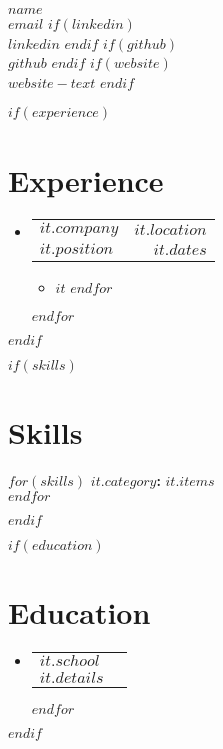 \documentclass[letterpaper,11pt]{article}
\makeatletter
\newcommand{\resumeItem}[1]{\item\small{#1 \vspace{-2pt}}}
\newcommand{\resumeSubheading}[4]{
  \vspace{-2pt}\item
    \begin{tabular*}{0.97\textwidth}[t]{l@{\extracolsep{\fill}}r}
      \textbf{#1} & #2 \\
      \textit{\small#3} & \textit{\small #4} \\
    \end{tabular*}\vspace{-7pt}
}
\newcommand{\resumeEducationHeading}[2]{
  \vspace{-2pt}\item
    \begin{tabular*}{0.97\textwidth}[t]{l@{\extracolsep{\fill}}r}
      \textbf{#1} \\
      \textit{\small#2} \\
    \end{tabular*}\vspace{-5pt}
}
\newcommand{\resumeSubHeadingListStart}{\begin{itemize}[leftmargin=0.15in, label={}]}
\newcommand{\resumeSubHeadingListEnd}{\end{itemize}}
\newcommand{\resumeItemListStart}{\begin{itemize}}
\newcommand{\resumeItemListEnd}{\end{itemize}\vspace{-5pt}}
\makeatother
\begin{document}
\begin{center}
    \textbf{\Huge \scshape $name$} \\ \vspace{3pt}
    \small
    \faAt \hspace{.5pt} \href{mailto:$email$}{$email$}
    $if(linkedin)$
    $$ $$ \faLinkedinSquare \hspace{.5pt} \href{https://www.linkedin.com/in/$linkedin$}{$linkedin$}
    $endif$
    $if(github)$
    $$ $$ \faGithub \hspace{.5pt} \href{https://github.com/$github$}{$github$}
    $endif$
    $if(website)$
    $$ $$ \faGlobe \hspace{.5pt} \href{$website$}{$website-text$}
    $endif$
\end{center}

$if(experience)$
\section{Experience}
\vspace{3pt}
\resumeSubHeadingListStart
$for(experience)$
\resumeSubheading
  {$it.company$}{$it.location$}
  {$it.position$}{$it.dates$}
  \resumeItemListStart
    $for(it.highlights)$
    \resumeItem{$it$}
    $endfor$
  \resumeItemListEnd
$endfor$
\resumeSubHeadingListEnd
$endif$

$if(skills)$
\section{Skills}
\vspace{2pt}
\resumeSubHeadingListStart
\small{\item{
    $for(skills)$
    \textbf{$it.category$:} {$it.items$} \\ \vspace{3pt}
    $endfor$
}}
\resumeSubHeadingListEnd
$endif$

$if(education)$
\section{Education}
\vspace{3pt}
\resumeSubHeadingListStart
$for(education)$
\resumeEducationHeading
  {$it.school$}
  {$it.details$}
$endfor$
\resumeSubHeadingListEnd
$endif$
\end{document}
